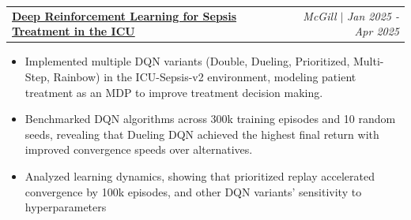 \documentclass[letterpaper,11pt]{article}
\makeatletter
\newcommand{\resumeItem}[1]{
  \item\small{
    {#1 \vspace{-2pt}}
  }
}
\newcommand{\resumeProjectHeading}[2]{
    \item\small
    \begin{tabular*}{0.97\textwidth}{l@{\extracolsep{\fill}}r}
      \small#1 & #2 \\
    \end{tabular*}\vspace{-7pt}
}
\newcommand{\resumeItemListStart}{\begin{itemize}}
\newcommand{\resumeItemListEnd}{\end{itemize}\vspace{-5pt}}
\makeatother
\begin{document}
        

  

  \resumeProjectHeading {\href{https://github.com/nicksmits1/COMP-579-Reinforcement-Learning}{\textbf{Deep Reinforcement Learning for Sepsis Treatment in the ICU \faGithub}}}{\emph{McGill} $|$ \textit{Jan 2025 - Apr 2025}}
      \resumeItemListStart
        \resumeItem{Implemented multiple DQN variants (Double, Dueling, Prioritized, Multi-Step, Rainbow) in the ICU-Sepsis-v2 environment, modeling patient treatment as an MDP to improve treatment decision making.}
        \resumeItem{Benchmarked DQN algorithms across 300k training episodes and 10 random seeds, revealing that Dueling DQN achieved the highest final return with improved convergence speeds over alternatives.}
        \resumeItem{Analyzed learning dynamics, showing that prioritized replay accelerated convergence by 100k episodes, and other DQN variants' sensitivity to hyperparameters}
      \resumeItemListEnd
\end{document}
